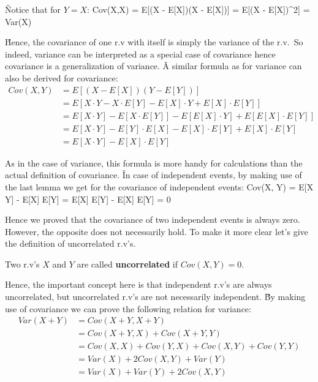 \v

Notice that for $Y=X$:
\bse
Cov(X,X) = E[(X - E[X])(X - E[X])] = E[(X - E[X])^2] = Var(X)
\ese

\v

Hence, the covariance of one r.v with itself is simply the variance of the r.v.\ So indeed, variance can be
interpreted as a special case of covariance hence covariance is a generalization of variance. \v

A similar formula as for variance can also be derived for covariance:
\begin{align*}
Cov(X, Y) &= E[(X - E[X])(Y-E[Y])] \\
&= E[X \cdot Y - X \cdot E[Y] - E[X] \cdot Y + E[X] \cdot E[Y]] \\
&= E[X \cdot Y] - E[X \cdot E[Y]] - E[E[X] \cdot Y] + E[E[X] \cdot E[Y]] \\
&= E[X \cdot Y] - E[Y] \cdot E[X] - E[X] \cdot E[Y] + E[X] \cdot E[Y] \\
&= E[X \cdot Y] - E[X] \cdot E[Y]
\end{align*}

As in the case of variance, this formula is more handy for calculations than the actual definition of covariance. \v

In case of independent events, by making use of the last lemma we get for the covariance of independent events:
\bse
Cov(X, Y) = E[X \cdot Y] - E[X] \cdot E[Y] = E[X] \cdot E[Y] - E[X] \cdot E[Y] = 0
\ese

Hence we proved that the covariance of two independent events is always zero. However, the opposite does not
necessarily hold. To make it more clear let's give the definition of uncorrelated r.v's.

Two r.v's $X$ and $Y$ are called \textbf{uncorrelated} if $Cov(X, Y) = 0$.
\ed

Hence, the important concept here is that independent r.v's are always uncorrelated, but uncorrelated r.v's are not
necessarily independent. \v

By making use of covariance we can prove the following relation for variance:
\begin{align*}
Var(X + Y) &= Cov(X+Y, X+Y) \\
&= Cov(X+Y, X) + Cov(X+Y, Y) \\
&= Cov(X, X) + Cov(Y, X) + Cov(X, Y) + Cov(Y, Y) \\
&= Var(X) + 2Cov(X,Y) + Var(Y) \\
&= Var(X) + Var(Y) + 2Cov(X,Y)
\end{align*}

